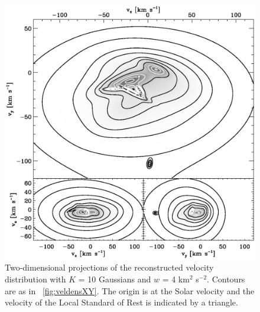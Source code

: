 \clearpage
\begin{figure}
\includegraphics[width=\textwidth]{figs_veldist/annotated_veldist.ps}
\caption[Two-dimensional projections of the reconstructed velocity distribution with $K$ = 10 Gaussians and $w$ = 4 km$^2$ s$^{-2}$]{Two-dimensional projections of the reconstructed velocity distribution with $K$ = 10 Gaussians and $w$ = 4 km$^2$ s$^{-2}$. Contours are as in \figurename~\ref{fig:veldensXY}. The origin is at the Solar velocity and the velocity of the Local Standard of Rest \citep{2005ApJ...629..268H} is indicated by a triangle.}%
\label{fig:annotated_veldist}
\end{figure}

